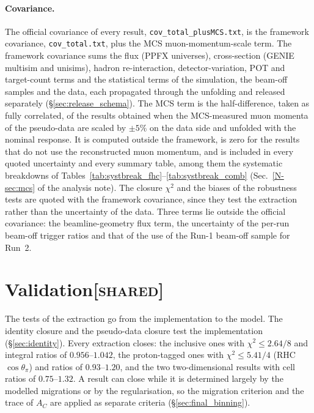 \documentclass[11pt,a4paper]{article}
\newcommand{\noteref}[2]{#1~\ref{N-#2} of the analysis note}
\newcommand{\scopetag}[1]{\hfill{\normalfont\small\textsc{[#1]}}}
\begin{document}
\paragraph{Covariance.} The official covariance of every result, \texttt{cov\_total\_plusMCS.txt}, is
the framework covariance, \texttt{cov\_total.txt}, plus the MCS muon-momentum-scale term. The framework
covariance sums the flux (PPFX universes), cross-section (GENIE multisim and unisims), hadron
re-interaction, detector-variation, POT and target-count terms and the statistical terms of the
simulation, the beam-off samples and the data, each propagated through the unfolding and released
separately (\S\ref{sec:release_schema}). The MCS term is the half-difference, taken as fully
correlated, of the results obtained when the MCS-measured muon momenta of the pseudo-data are scaled
by $\pm5\%$ on the data side and unfolded with the nominal response. It is computed outside the
framework, is zero for the results that do not use the reconstructed muon momentum, and is
included in every quoted uncertainty and every summary table, among them the systematic breakdowns of
Tables~\ref{tab:systbreak_fhc}--\ref{tab:systbreak_comb} (\noteref{Sec.}{sec:mcs}). The closure
$\chi^2$ and the biases of the robustness tests are quoted with the framework covariance, since they
test the extraction rather than the uncertainty of the data. Three terms lie outside the official
covariance: the beamline-geometry flux term, the uncertainty of the per-run beam-off trigger ratios and that of the use of the Run-1 beam-off
sample for Run~2.

\section[Validation]{Validation\scopetag{shared}}
\label{sec:supp_validation}

The tests of the extraction go from the implementation to the model. The identity closure and the
pseudo-data closure test the implementation (\S\ref{sec:identity}). Every extraction closes: the
inclusive ones with $\chi^2\le2.64/8$ and integral ratios of $0.956$--$1.042$, the proton-tagged ones
with $\chi^2\le5.41/4$ (RHC $\cos\theta_\pi$) and ratios of $0.93$--$1.20$, and the two two-dimensional
results with cell ratios of $0.75$--$1.32$. A result can close while it is determined largely by the
modelled migrations or by the regularisation, so the migration criterion and the trace of $A_C$ are
applied as separate criteria (\S\ref{sec:final_binning}).
\end{document}
